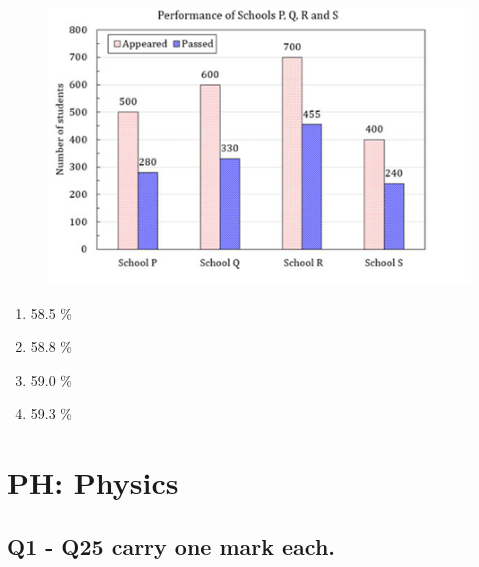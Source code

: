 \documentclass[journal,12pt,onecolumn]{IEEEtran}
\theoremstyle{remark}
\begin{document}
\begin{enumerate}
  \begin{figure}[H]
    \centering
    \includegraphics[width=0.5\columnwidth]{fig/Q10.png}
     \caption*{}
    \label{fig:Q10}
\end{figure}
    
    \begin{enumerate}
        \item 58.5 \%
        \item 58.8 \%
        \item 59.0 \%
        \item 59.3 \%
    \end{enumerate}
    
\end{enumerate}

\section*{PH: Physics}
\subsection*{Q1 - Q25 carry one mark each.}
\end{document}
